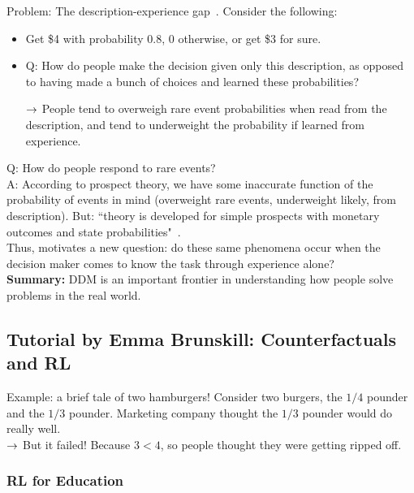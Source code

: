 Problem: The description-experience gap~\cite{hertwig2009description}. Consider the following:
\begin{itemize}
    \item Get \$4 with probability $0.8$, 0 otherwise, or get \$3 for sure. 
    \item Q: How do people make the decision given only this description, as opposed to having made a bunch of choices and learned these probabilities?
    
    $\rightarrow$ People tend to overweigh rare event probabilities when read from the description, and tend to underweight the probability if learned from experience.
\end{itemize}


Q: How do people respond to rare events? \\

A: According to prospect theory, we have some inaccurate function of the probability of events in mind (overweight rare events, underweight likely, from description). But: ``theory is developed for simple prospects with monetary outcomes and state probabilities"~\citet{kahneman2013choices}. \\

Thus, motivates a new question: do these same phenomena occur when the decision maker comes to know the task through experience alone? \\

{\bf Summary:} DDM is an important frontier in understanding how people solve problems in the real world.

\spacerule

\subsection{Tutorial by Emma Brunskill: Counterfactuals and RL}

Example: a brief tale of two hamburgers! Consider two burgers, the $1/4$ pounder and the $1/3$ pounder. Marketing company thought the $1/3$ pounder would do really well.\\

$\rightarrow$ But it failed! Because $3 < 4$, so people thought they were getting ripped off. \\

\subsubsection{RL for Education}

